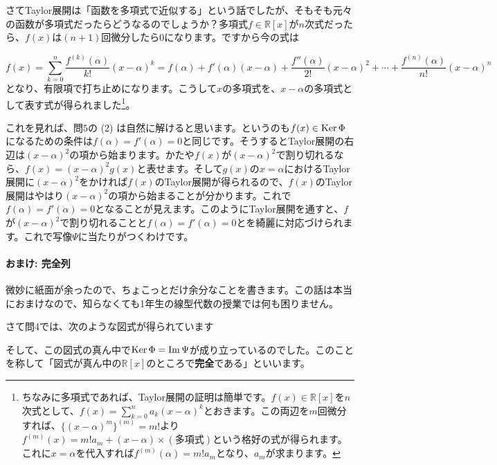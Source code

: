 さてTaylor展開は「函数を多項式で近似する」という話でしたが、そもそも元々の函数が多項式だったらどうなるのでしょうか？多項式$f\in\mathbb{R}[x]$が$n$次式だったら、$f(x)$は$(n+1)$回微分したら$0$になります。ですから今の式は

\[
f(x) = \sum_{k = 0}^{n} \frac{f^{(k)}(\alpha)}{k!} (x - \alpha)^k = f(\alpha) + f'(\alpha)(x - \alpha) + \frac{f''(\alpha)}{2!}(x - \alpha)^2 + \cdots + \frac{f^{(n)}(\alpha)}{n!}(x - \alpha)^n
\]
となり、有限項で打ち止めになります。こうして$x$の多項式を、$x - \alpha$の多項式として表す式が得られました\footnote{ちなみに多項式であれば、Taylor展開の証明は簡単です。$f(x)\in\mathbb{R}[x]$を$n$次式として、$f(x) = \sum_{k = 0}^n a_k (x - \alpha)^k$とおきます。この両辺を$m$回微分すれば、$\bigl\{(x - \alpha)^m\bigr\}^{(m)} = m!$より$f^{(m)}(x) = m!a_m + (x - \alpha)\times(\text{多項式})$という格好の式が得られます。これに$x = \alpha$を代入すれば$f^{(m)}(\alpha) = m! a_m$となり、$a_m$が求まります。}。

これを見れば、問$5$の (2) は自然に解けると思います。というのも$f(x)\in \operatorname{Ker} \Phi$になるための条件は$f(\alpha) = f'(\alpha) = 0$と同じです。そうするとTaylor展開の右辺は$(x - \alpha)^2$の項から始まります。かたや$f(x)$が$(x - \alpha)^2$で割り切れるなら、$f(x) = (x - \alpha)^2 g(x)$と表せます。そして$g(x)$の$x = \alpha$におけるTaylor展開に$(x - \alpha)^2$をかければ$f(x)$のTaylor展開が得られるので、$f(x)$のTaylor展開はやはり$(x - \alpha)^2$の項から始まることが分かります。これで$f(\alpha) = f'(\alpha) = 0$となることが見えます。このようにTaylor展開を通すと、$f$が$(x - \alpha)^2$で割り切れることと$f(\alpha) = f'(\alpha) = 0$とを綺麗に対応づけられます。これで写像$\Psi$に当たりがつくわけです。

\newpage

\paragraph{おまけ: 完全列} 微妙に紙面が余ったので、ちょこっとだけ余分なことを書きます。この話は本当におまけなので、知らなくても1年生の線型代数の授業では何も困りません。

さて問4では、次のような図式が得られています
\begin{center}
\end{center}
そして、この図式の真ん中で$\operatorname{Ker} \Phi = \mathrm{Im}\, \Psi$が成り立っているのでした。このことを称して「図式が真ん中の$\mathbb{R}[x]$のところで\textbf{完全}である」といいます。


